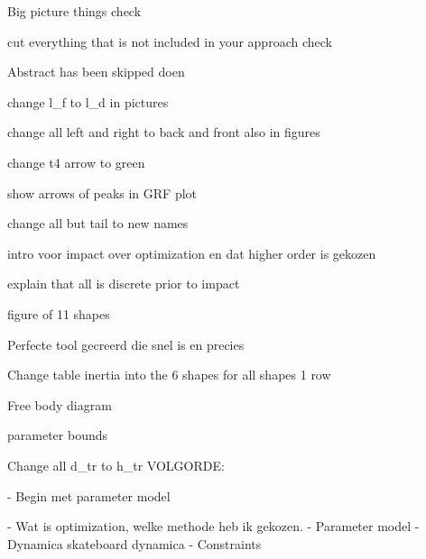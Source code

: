 Big picture things  check

cut everything that is not included in your approach check

Abstract has been skipped doen

change l_f to l_d in pictures

change all left and right to back and front
    also in figures

change t4 arrow to green

show arrows of peaks in GRF plot

change all but tail to new names

intro voor impact over optimization en dat higher order is gekozen

explain that all is discrete prior to impact

figure of 11 shapes 

Perfecte tool gecreerd die snel is en precies 

Change table inertia into the 6 shapes for all shapes 1 row

Free body diagram

parameter bounds

Change all d_tr to h_tr
VOLGORDE:

- Begin met parameter model

- Wat is optimization, welke methode heb ik gekozen. 
- Parameter model 
- Dynamica
   skateboard
   dynamica        
- Constraints
   